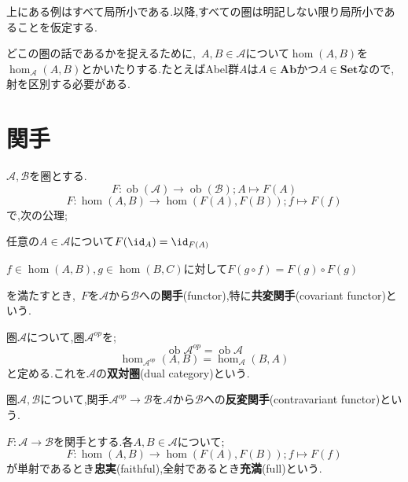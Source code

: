 上にある例はすべて局所小である.以降,すべての圏は明記しない限り局所小であることを仮定する.

どこの圏の話であるかを捉えるために,~$A,B\in\mathscr{A}$について$\hom(A,B)$を$\hom_{\mathscr{A}}(A,B)$とかいたりする.たとえばAbel群$A$は$A\in\mathbf{Ab}$かつ$A\in\mathbf{Set}$なので,射を区別する必要がある.

\section{関手}
\begin{defi}[関手]
	$\mathscr{A},\mathscr{B}$を圏とする.
	\[F:\operatorname{ob}(\mathscr{A})\to\operatorname{ob}(\mathscr{B});A\mapsto F(A)\]
	\[F:\hom(A,B)\to\hom(F(A),F(B));f\mapsto F(f)\]
	で,次の公理;
	\begin{sakura}
		\item 任意の$A\in\mathscr{A}$について$F(\id_A)=\id_{F(A)}$
		\item $f\in\hom(A,B),g\in\hom(B,C)$に対して$F(g\circ f)=F(g)\circ F(g)$
	\end{sakura}
	を満たすとき,~$F$を$\mathscr{A}$から$\mathscr{B}$への\textbf{関手}(functor),特に\textbf{共変関手}(covariant functor)という.
\end{defi}
\begin{defi}[双対圏]
	圏$\mathscr{A}$について,圏$\mathscr{A}^{op}$を;
	\[\operatorname{ob}\mathscr{A}^{op}=\operatorname{ob}\mathscr{A}\]
	\[\hom_{\mathscr{A}^{op}}(A,B)=\hom_{\mathscr{A}}(B,A)\]
	と定める.これを$\mathscr{A}$の\textbf{双対圏}(dual category)という.
\end{defi}
\begin{defi}[反変関手]
	圏$\mathscr{A},\mathscr{B}$について,関手$\mathscr{A}^{op}\to\mathscr{B}$を$\mathscr{A}$から$\mathscr{B}$への\textbf{反変関手}(contravariant functor)という.
\end{defi}
\begin{defi}[忠実,充満]
	$F:\mathscr{A}\to\mathscr{B}$を関手とする.各$A,B\in\mathscr{A}$について;
	\[F:\hom(A,B)\to\hom(F(A),F(B));f\mapsto F(f)\]
	が単射であるとき\textbf{忠実}(faithful),全射であるとき\textbf{充満}(full)という.
\end{defi}
\begin{figure}[H]
	\centering
	\caption{}
\end{figure}


